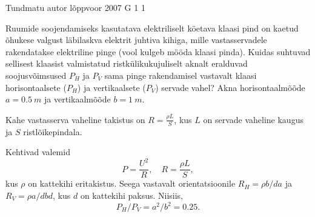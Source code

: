 {Tundmatu autor} %
{lõppvoor} %
{2007} %
{G 1} %
{1} %
{
\ifStatement
Ruumide soojendamiseks kasutatava elektriliselt köetava klaasi pind on kaetud õhukese valgust läbilaskva elektrit juhtiva kihiga, mille vastasservadele rakendatakse elektriline pinge (vool kulgeb mööda klaasi pinda). Kuidas suhtuvad sellisest klaasist valmistatud ristkülikukujuliselt aknalt eralduvad soojusvõimsused $P_H$ ja $P_V$ sama pinge rakendamisel vastavalt klaasi horisontaalsete ($P_H$) ja vertikaalsete ($P_V$) servade vahel? Akna horisontaalmõõde $a = \SI{0,5}{m}$ ja vertikaalmõõde $b = \SI{1}{m}$.
\fi


\ifHint
Kahe vastasserva vaheline takistus on $R = \frac{\rho L}{S}$, kus $L$ on servade vaheline kaugus ja $S$ ristlõikepindala.
\fi


\ifSolution
Kehtivad valemid
\[
P=\frac{U^{2}}{R}, \quad R=\frac{\rho L}{S},
\]
kus $\rho$ on kattekihi eritakistus. Seega vastavalt orientatsioonile $R_H = \rho b/da$ ja $R_V = \rho a/db d$, kus $d$ on kattekihi paksus. Niisiis,
\[
P_H/P_V = a ^2/b^2 = \num{0,25}.
\]

\fi
}